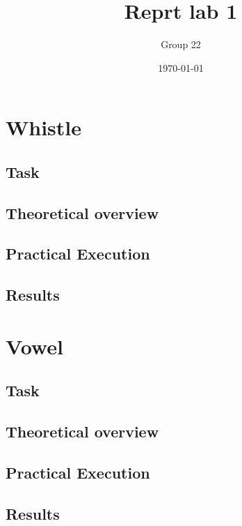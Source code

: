 \documentclass[12pt]{article}
\title{Reprt lab 1}
\author{Group 22}
\date{\today}
\begin{document}
%

\pagebreak

\maketitle

\pagebreak

\pagebreak

\section{Whistle}
\subsection{Task}


\subsection{Theoretical overview}

\subsection{Practical Execution}

\subsection{Results}

\section{Vowel}

\subsection{Task}

\subsection{Theoretical overview}

\subsection{Practical Execution}

\subsection{Results}
\end{document}
